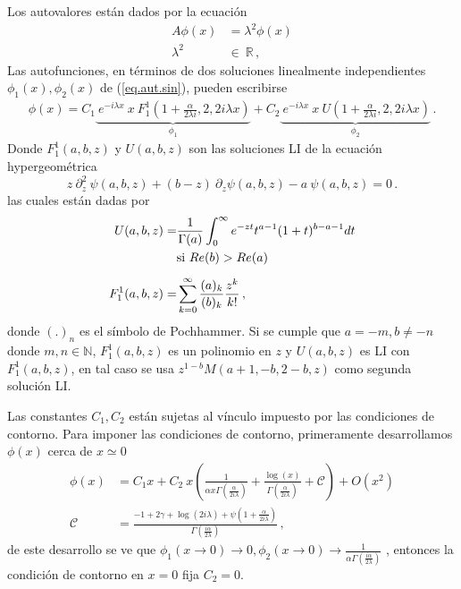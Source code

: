 Los autovalores están dados por la ecuación 
\begin{equation}
\begin{aligned}
    A  \phi (x)  &=   \lambda ^2 \phi (x) \\[5pt]
    \lambda ^2 \ &\in \ \mathbb{R}  
    \, ,
\end{aligned}
\label{eq.aut.sin}
\end{equation}
Las autofunciones, en términos de dos soluciones linealmente independientes $\phi _1 (x), \phi _2 (x)$ de (\ref{eq.aut.sin}), pueden escribirse
\begin{equation}
\begin{aligned}
    \phi (x) =
    C _1
    \underbrace{
     \ e ^{-i \lambda x} \ x \ F _{1} ^{1} \left( 1+\frac{ \alpha}{2 \lambda i },2,2 i \lambda x \right) } _ {\phi_1} + 
      C _2 \underbrace{ \ e^{-i \lambda x } \ x \ U \left( 1+\frac{ \alpha}{2 \lambda i },2,2 i \lambda x \right) } _{\phi_2} 
    \, . 
\end{aligned}
\label{eq.phi}
\end{equation}
Donde $F _1 ^1(a,b,z)$ y $ U(a,b,z)$ son las soluciones LI de la ecuación hypergeométrica
\begin{equation}
    z \ \partial ^2 _z \ \psi (a,b,z) + (b-z) \
    \partial _z \psi (a,b,z)
    -a \ \psi (a,b,z) = 0 \, .
\end{equation}
las cuales están dadas por \cite{Abramowitz:hyper}
\begin{align}
	U(a,b,z) = &\frac{1}{\Gamma (a)} 
	\int _0 ^{\infty} e ^{-zt}
	t ^{a-1}
	(1+t) ^{b-a-1}
	dt \\
	& {\rm si \ } Re (b) > Re(a) 
	\nonumber
	\\[5pt]
	F _1 ^1 (a,b,z) =& \sum _ {k=0} ^{\infty} 
	\frac{(a) _k}{(b) _k} 
	\frac{z ^k}{k!} 
	\, ,
\end{align}
donde $(.) _n$ es el símbolo de Pochhammer.
Si se cumple que  $a=-m,b \neq -n$ donde $ m,n \in \mathbb{N}$, $F _1 ^1 (a,b,z)$ es un polinomio en $z$ y $U(a,b,z)$ es LI con $F _1 ^1 (a,b,z)$, en tal caso se usa $z^{1-b} M(a+1,-b,2-b,z)$ como segunda solución LI.


Las constantes $C_1,C_2$ están sujetas al vínculo impuesto por las condiciones de contorno.
Para imponer las condiciones de contorno, primeramente desarrollamos $\phi (x)$ cerca de $x \simeq 0$ 
\begin{align}
\phi  ( x ) &=
C _1  x  + 
C _2 \ x 
\left( 
\frac{1}{  \alpha x  \Gamma ( \frac{ \alpha}{2 i \lambda}  )   }  +
\frac{\log (x) }{\Gamma ( \frac{ \alpha}{2 i \lambda} ) } + \mathscr{C} \right) + O(x ^2)
	\nonumber
\\[10pt]
\mathscr{C} &= 
\frac{
-1 + 2 \gamma + \log ( 2  i \lambda ) + \psi (1 + \frac{ \alpha}{2 i \lambda})
}
{\Gamma (\frac{i \alpha}{2 \lambda})}
\, ,
\label{eq.scat}
\end{align}
de este desarrollo se ve que $ \phi _1 (x \rightarrow 0 ) \rightarrow 0,\phi _2 (x \rightarrow 0)  \rightarrow
\frac{1}{  \alpha   \Gamma ( \frac{i \alpha}{2 \lambda}  )   } $ , entonces la condición de contorno en $x=0$ fija $C _2 =0$. 


